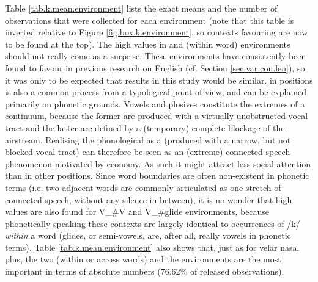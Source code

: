Table \ref{tab.k.mean.environment} lists the exact means and the number of observations that were collected for each environment (note that this table is inverted relative to Figure \ref{fig.box.k.environment}, so contexts favouring  are now to be found at the top).
The high  values in  and  (within word) environments should not really come as a surprise.
These environments have consistently been found to favour  in previous research on  English (cf. Section \ref{sec.var.con.len}), so it was only to be expected that results in this study would be similar.
 in  positions is also a common process from a typological point of view, and can be explained primarily on phonetic grounds. 
Vowels and plosives constitute the extremes of a continuum, because the former are produced with a virtually unobstructed vocal tract and the latter are defined by a (temporary) complete blockage of the airstream.
Realising the phonological   as a  (produced with a narrow, but not blocked vocal tract) can therefore be seen as an (extreme) connected speech phenomenon motivated by economy.
As such it might attract less social attention than in other positions.
Since word boundaries are often non-existent in phonetic terms (i.e. two adjacent words are commonly articulated as one stretch of connected speech, without any silence in between), it is no wonder that high  values are also found for V\_\#V and V\_\#glide environments, because phonetically speaking these contexts are largely identical to  occurrences of /k/ \emph{within} a word (glides, or semi-vowels, are, after all, really vowels in phonetic terms).
Table \ref{tab.k.mean.environment} also shows that, just as for velar nasal plus, the two  (within or across words) and the  environments are the most important in terms of absolute numbers (76.62\% of released observations).

